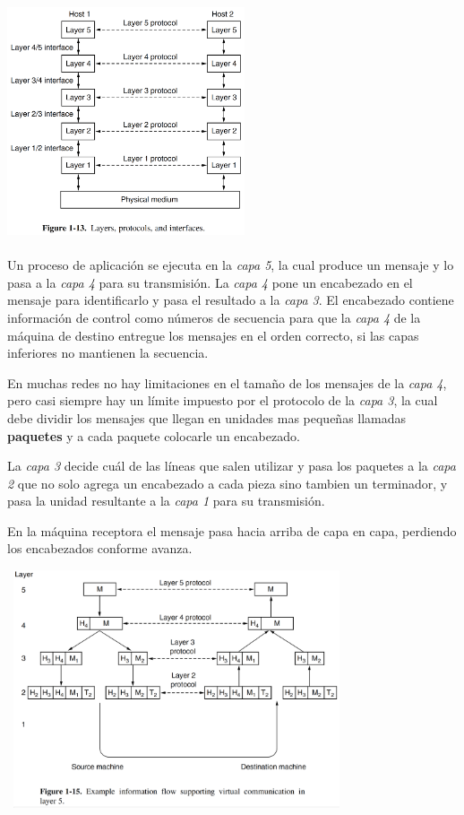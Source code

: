 \documentclass[10pt,a4paper]{report}
\begin{document}
\begin{center} 
	\includegraphics[width=7cm, height=7cm]{./imagenes/jerarquia1.png} 
\end{center}

\par Un proceso de aplicación se ejecuta en la \textit{capa 5}, la cual produce un 
mensaje y lo pasa a la \textit{capa 4} para su transmisión. La \textit{capa 4} pone un 
encabezado en el mensaje para identificarlo y pasa el resultado a la \textit{capa 3}. El 
encabezado contiene información de control como números de secuencia para que la 
\textit{capa 4} de la máquina de destino entregue los mensajes en el orden correcto, 
si las capas inferiores no mantienen la secuencia.

\par En muchas redes no hay limitaciones en el tamaño de los mensajes de la 
\textit{capa 4}, pero casi siempre hay un límite impuesto por el protocolo de la 
\textit{capa 3}, la cual debe dividir  los mensajes que llegan en unidades mas 
pequeñas llamadas \textbf{paquetes} y a cada paquete colocarle un encabezado.
\par La \textit{capa 3} decide cuál de las líneas que salen utilizar y pasa los paquetes 
a la \textit{capa 2} que no solo agrega un encabezado a cada pieza sino tambien un 
terminador, y pasa la unidad resultante a la \textit{capa 1} para su transmisión.
\par En la máquina receptora el mensaje pasa hacia arriba de capa en capa, perdiendo 
los encabezados conforme avanza.

\begin{center} 
	\includegraphics[width=10cm, height=7cm]{./imagenes/jerarquia2.png} 
\end{center}
\end{document}
